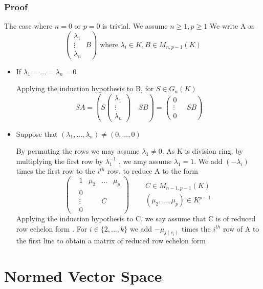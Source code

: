 \documentclass{book}
\begin{document}
\subsection*{Proof}The case where $n=0$ or $p=0$ is trivial.
We assume $n\geq 1,p\geq1$ We write A as $$\left(\begin{aligned}
    \lambda_1\\\vdots\\\lambda_n
\end{aligned}\ B\right) \text{ where }
 \lambda_i\in K, B\in M_{n,p-1}(K)$$
\begin{itemize}
    \item If $\lambda_1=...=\lambda_n=0$ 
    
    Applying the induction hypothesis to B, for $S\in G_n(K)$$$ SA=\left(S\left(\begin{aligned}
        \lambda_1\\\vdots\\\lambda_n
    \end{aligned}\right)\quad SB\right)=\left(\begin{aligned}
        0\\\vdots\\0
    \end{aligned} \quad SB\right)$$
    \item Suppose that $(\lambda_1,...,\lambda_n)\not=(0,...,0)$
    
    By permuting the rows we may assume $\lambda_1\not=0$. As K is division ring, by multiplying the first row by $\lambda_1^{-1}$ , we amy assume $\lambda_1=1$. We add $(-\lambda_i)$ times the first row to the $i^{th}$ row, to reduce A to the form $$\left(\begin{aligned}
        &1 &\mu_2&\dots&\mu_p\\ & 0\\ &\vdots& &C\\ &0
    \end{aligned}\right)\quad \begin{aligned}
        &C\in M_{n-1,p-1}(K)\\ &(\mu_2,...,\mu_p)\in K^{p-1}
    \end{aligned}$$
    Applying the induction hypothesis to C, we say assume that C is of reduced row echelon form . For $i\in \{2,...,k\}$ we add $-\mu_{j(c_i)}$ times the $i^{th}$ row of A to the first line to obtain a matrix of reduced row echelon form
\end{itemize}
\chapter{Normed Vector Space}
\end{document}
